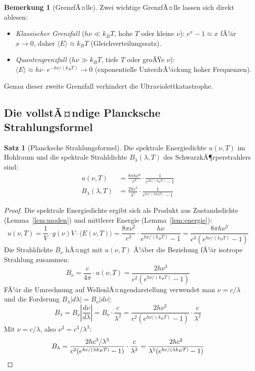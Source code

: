 ﻿\documentclass[a4paper,12pt]{article}
\theoremstyle{definition}
\newtheorem{satz}{Satz}
\newtheorem{bemerkung}{Bemerkung}
\begin{document}
\begin{bemerkung}[GrenzfÃ¤lle]
    Zwei wichtige GrenzfÃ¤lle lassen sich direkt ablesen:
    \begin{itemize}
        \item \emph{Klassischer Grenzfall} ($h\nu \ll k_B T$, hohe $T$ oder kleine $\nu$):
              $e^x - 1 \approx x$ fÃ¼r $x \to 0$, daher
              $\langle E \rangle \approx k_B T$ (Gleichverteilungssatz).
        \item \emph{Quantengrenzfall} ($h\nu \gg k_B T$, tiefe $T$ oder groÃŸe $\nu$):
              $\langle E \rangle \approx h\nu \cdot e^{-h\nu/(k_BT)} \to 0$
              (exponentielle UnterdrÃ¼ckung hoher Frequenzen).
    \end{itemize}
    Genau dieser zweite Grenzfall verhindert die Ultraviolettkatastrophe.
\end{bemerkung}

\subsection{Die vollstÃ¤ndige Plancksche Strahlungsformel}

\begin{satz}[Plancksche Strahlungsformel]
\label{satz:planck}
    Die spektrale Energiedichte $u(\nu, T)$ im Hohlraum und die spektrale
    Strahldichte $B_\lambda(\lambda, T)$ des SchwarzkÃ¶rperstrahlers sind:
    \begin{align}
        u(\nu, T) &= \frac{8\pi h \nu^3}{c^3} \cdot \frac{1}{e^{h\nu/(k_B T)} - 1}
        \label{eq:planck_nu} \\[6pt]
        B_\lambda(\lambda, T) &= \frac{2hc^2}{\lambda^5} \cdot
        \frac{1}{e^{hc/(\lambda k_B T)} - 1}
        \label{eq:planck_lam}
    \end{align}
\end{satz}

\begin{proof}
    Die spektrale Energiedichte ergibt sich als Produkt aus Zustandsdichte
    (Lemma~\ref{lem:moden}) und mittlerer Energie (Lemma~\ref{lem:energie}):
    \[
        u(\nu, T) = \frac{1}{V} \cdot g(\nu) V \cdot \langle E(\nu,T) \rangle
        = \frac{8\pi\nu^2}{c^3} \cdot \frac{h\nu}{e^{h\nu/(k_BT)}-1}
        = \frac{8\pi h\nu^3}{c^3(e^{h\nu/(k_BT)}-1)}
    \]
    Die Strahldichte $B_\nu$ hÃ¤ngt mit $u(\nu,T)$ Ã¼ber die Beziehung
    fÃ¼r isotrope Strahlung zusammen:
    \[
        B_\nu = \frac{c}{4\pi} \cdot u(\nu, T)
        = \frac{2h\nu^3}{c^2(e^{h\nu/(k_BT)}-1)}
    \]
    FÃ¼r die Umrechnung auf WellenlÃ¤ngendarstellung verwendet man
    $\nu = c/\lambda$ und die Forderung $B_\lambda |d\lambda| = B_\nu |d\nu|$:
    \[
        B_\lambda = B_\nu \left|\frac{d\nu}{d\lambda}\right|
        = B_\nu \cdot \frac{c}{\lambda^2}
        = \frac{2h\nu^3}{c^2(e^{h\nu/(k_BT)}-1)} \cdot \frac{c}{\lambda^2}
    \]
    Mit $\nu = c/\lambda$, also $\nu^3 = c^3/\lambda^3$:
    \[
        B_\lambda = \frac{2h c^3/\lambda^3}{c^2(e^{hc/(\lambda k_BT)}-1)}
        \cdot \frac{c}{\lambda^2}
        = \frac{2hc^2}{\lambda^5(e^{hc/(\lambda k_BT)}-1)} \qedhere
    \]
\end{proof}
\end{document}
